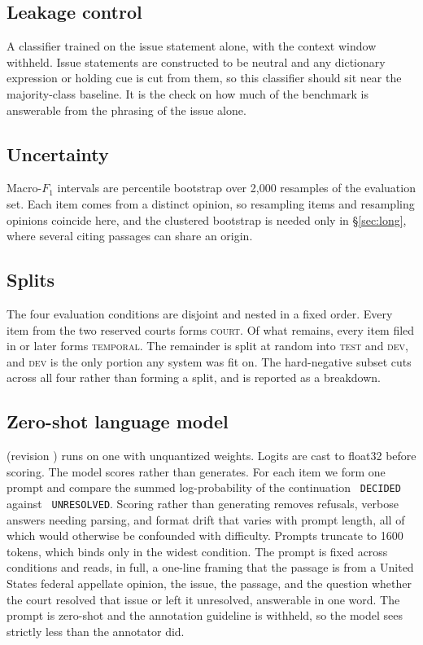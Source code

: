 \subsection{Leakage control} A classifier trained on the issue statement alone,
with the context window withheld. Issue statements are constructed to be neutral and any
dictionary expression or holding cue is cut from them, so this classifier should
sit near the majority-class baseline. It is the check on how much of the benchmark
is answerable from the phrasing of the issue alone.

\subsection{Uncertainty} Macro-$F_1$ intervals are percentile bootstrap over
2{,}000 resamples of the evaluation set. Each item comes from a distinct opinion,
so resampling items and resampling opinions coincide here, and the clustered
bootstrap is needed only in \S\ref{sec:long}, where several citing passages can
share an origin.

\subsection{Splits} The four evaluation conditions are disjoint and nested in a
fixed order. Every item from the two reserved courts forms \textsc{court}. Of what
remains, every item filed in \TemporalCut{} or later forms \textsc{temporal}. The remainder
is split at random into \textsc{test} and \textsc{dev}, and \textsc{dev} is the
only portion any system was fit on. The hard-negative subset cuts across all four
rather than forming a split, and is reported as a breakdown.



\subsection{Zero-shot language model} \LLMName{} (revision
\LLMRevision{}) runs on one \LLMDevice{} with unquantized \LLMDtype{} weights. Logits are
cast to float32 before scoring. The model scores rather than generates. For each item we form one
prompt and compare the summed log-probability of the continuation
\texttt{ DECIDED} against \texttt{ UNRESOLVED}. Scoring rather than generating
removes refusals, verbose answers needing parsing, and format drift that varies
with prompt length, all of which would otherwise be confounded with difficulty.
Prompts truncate to 1600 tokens, which binds only in the widest condition. The
prompt is fixed across conditions and reads, in full, a one-line framing that the
passage is from a United States federal appellate opinion, the issue, the passage,
and the question whether the court resolved that issue or left it unresolved,
answerable in one word. The prompt is zero-shot and the annotation
guideline is withheld, so the model sees strictly less than the annotator did.


